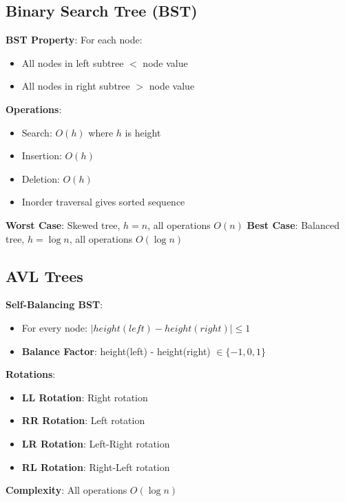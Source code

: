 \documentclass[12pt,a4paper]{report}
\begin{document}
\subsection{Binary Search Tree (BST)}
\begin{concept}
\textbf{BST Property}: For each node:
\begin{itemize}
    \item All nodes in left subtree $<$ node value
    \item All nodes in right subtree $>$ node value
\end{itemize}

\textbf{Operations}:
\begin{itemize}
    \item Search: $O(h)$ where $h$ is height
    \item Insertion: $O(h)$
    \item Deletion: $O(h)$
    \item Inorder traversal gives sorted sequence
\end{itemize}

\textbf{Worst Case}: Skewed tree, $h = n$, all operations $O(n)$
\textbf{Best Case}: Balanced tree, $h = \log n$, all operations $O(\log n)$
\end{concept}

\subsection{AVL Trees}
\begin{concept}
\textbf{Self-Balancing BST}:
\begin{itemize}
    \item For every node: $|height(left) - height(right)| \leq 1$
    \item \textbf{Balance Factor}: height(left) - height(right) $\in \{-1, 0, 1\}$
\end{itemize}

\textbf{Rotations}:
\begin{itemize}
    \item \textbf{LL Rotation}: Right rotation
    \item \textbf{RR Rotation}: Left rotation
    \item \textbf{LR Rotation}: Left-Right rotation
    \item \textbf{RL Rotation}: Right-Left rotation
\end{itemize}

\textbf{Complexity}: All operations $O(\log n)$
\end{concept}
\end{document}
